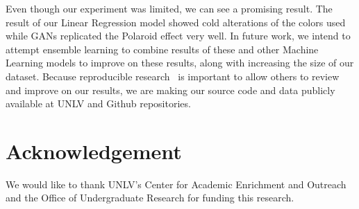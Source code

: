 \documentclass[conference]{IEEEtran}
\begin{document}
Even though our experiment was limited, we can see a promising result. The result of our Linear Regression model showed cold alterations of the colors used while GANs replicated the Polaroid effect very well. In future work, we intend to attempt ensemble learning to combine results of these and other Machine Learning models to improve on these results, along with increasing the size of our dataset. Because reproducible research~\cite{fonseca2020state} is important to allow others to review and improve on our results, we are making our source code and data publicly available at UNLV and Github repositories.

\section{Acknowledgement}\label{section:acknowledgement}
We would like to thank UNLV's Center for Academic Enrichment and Outreach and the Office of Undergraduate Research for funding this research. 




 
\end{document}
